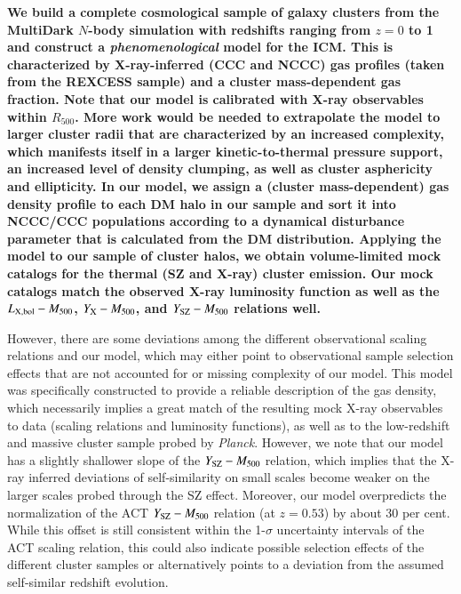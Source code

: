 \documentclass[useAMS,usenatbib]{mn2e}
\begin{document}
{\bf We build a complete cosmological sample of galaxy clusters from the
  MultiDark $N$-body simulation with redshifts ranging from $z = 0$ to 1 and
  construct a \emph{phenomenological} model for the ICM. This is characterized
  by X-ray-inferred (CCC and NCCC) gas profiles (taken from the REXCESS sample)
  and a cluster mass-dependent gas fraction. Note that our model is calibrated
  with X-ray observables within $R_{500}$. More work would be needed to
  extrapolate the model to larger cluster radii that are characterized by an
  increased complexity, which manifests itself in a larger kinetic-to-thermal
  pressure support, an increased level of density clumping, as well as cluster
  asphericity and ellipticity. In our model, we assign a (cluster
  mass-dependent) gas density profile to each DM halo in our sample and sort it
  into NCCC/CCC populations according to a dynamical disturbance parameter
  that is calculated from the DM distribution. Applying the model to our sample
  of cluster halos, we obtain volume-limited mock catalogs for the thermal (SZ
  and X-ray) cluster emission. Our mock catalogs match the observed X-ray
  luminosity function as well as the $L_{{\mathrm{X, bol}}}-M_{500}$,
  $Y_{{\mathrm{X}}}-M_{500}$, and $Y_{{\mathrm{SZ}}}-M_{500}$ relations well.

  However, there are some deviations among the different observational scaling
  relations and our model, which may either point to observational sample
  selection effects that are not accounted for or missing complexity of our
  model. This model was specifically constructed to provide a reliable
  description of the gas density, which necessarily implies a great match of the
  resulting mock X-ray observables to data (scaling relations and luminosity
  functions), as well as to the low-redshift and massive cluster sample probed by
  {\em Planck}. However, we note that our model has a slightly shallower slope
  of the $Y_{{\mathrm{SZ}}}-M_{500}$ relation, which implies that the X-ray inferred
  deviations of self-similarity on small scales become weaker on the larger
  scales probed through the SZ effect. Moreover, our model overpredicts the
  normalization of the ACT $Y_{{\mathrm{SZ}}}-M_{500}$ relation (at $z=0.53$) by
  about 30 per cent. While this offset is still consistent within the 1-$\sigma$
  uncertainty intervals of the ACT scaling relation, this could also indicate
  possible selection effects of the different cluster samples or alternatively
  points to a deviation from the assumed self-similar redshift evolution.

}
\end{document}

